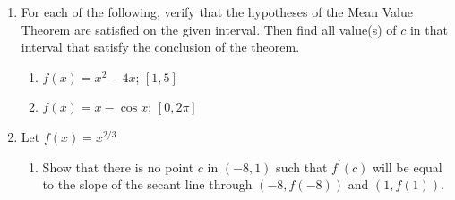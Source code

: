 \documentclass[12pt]{article}
\newif\ifans
\begin{document}
\begin{enumerate}
\begin{enumerate}
\end{enumerate}

\item For each of the following, verify that the hypotheses of the Mean Value Theorem are satisfied on the given interval. Then find all value(s) of $c$ in that interval that satisfy the conclusion of the theorem.

\begin{enumerate}

\item $f(x)=x^2-4x$; $[1,5]$

\ifans{\fbox{\parbox{1\linewidth}{$f(x)$ is a polynomial; so, it is continuous and differentiable everywhere on $(-\infty,\infty)$.  In particular, it is continuous on $[1,5]$ and differentiable on $(1,5)$.  Thus, all of the hypotheses of the Mean Value Theorem are satisfied and there exists a $c$ in $(1,5)$ with $f^{\prime}(c)=\frac{f(5)-f(1)}{5-1}$.  In particular, $c=3$.}}}\fi

\item $f(x)=x-\cos{x}$; $[0,2\pi]$

\ifans{\fbox{\parbox{1\linewidth}{$x$ is a polynomial and is, therefore, continuous and differentiable everywhere on $(-\infty,\infty)$.  $\cos{x}$ is also continuous and differentiable everywhere on $(-\infty,\infty)$.  So, since the difference of continuous functions is continuous and the difference of differentiable functions is differentiable, we have that $f(x)$  is continuous and differentiable everywhere on $(-\infty,\infty)$.  In particular, it is continuous on $[0,2\pi]$ and differentiable on $(0,2\pi)$.  Thus, all of the hypotheses of the Mean Value Theorem are satisfied and there exists a $c$ in $(0,2\pi)$ with $f^{\prime}(c)=\frac{f(2\pi)-f(0)}{2\pi-0}$.  In particular, $c=\pi$.}}}\fi

\end{enumerate}

\item Let $f(x)=x^{2/3}$

\begin{enumerate}

\item Show that there is no point $c$ in $(-8,1)$ such that $f^{\prime}(c)$ will be equal to the slope of the secant line through $(-8,f(-8))$ and $(1,f(1))$.

\ifans{\fbox{\parbox{1\linewidth}{It can be shown that the slope of the secant line which passes through $(-8,f(-8))$ and $(1,f(1))$ is $-\frac{1}{3}$.  And, $f^{\prime}(x)=\frac{2}{3x^{1/3}}$.  However, the only solution to $f^{\prime}(x)=-\frac{1}{3}$ is $-8$, which is not in $(-8,1)$.}}}\fi


\end{enumerate}
\end{enumerate}
\end{document}
